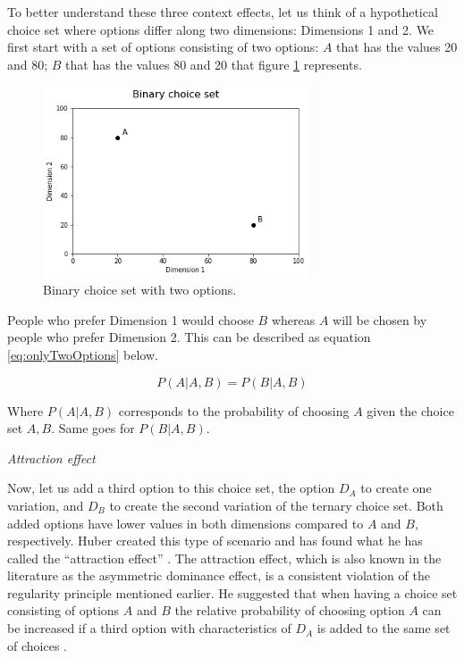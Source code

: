 \documentclass[a4paper,12pt]{article}
\newcommand{\citeyearonly}[1]{\citeyearpar{#1}}
\begin{document}
To better understand these three context effects, let us think of a hypothetical choice set where options differ along two dimensions: Dimensions 1 and 2. We first start with a set of options consisting of two options: $A$ that has the values 20 and 80; $B$ that has the values 80 and 20 that figure \ref{fig:binaryChoiseSet} represents. 

\begin{figure}[h]
    \centering
    \includegraphics[width=0.7\textwidth]{staticFiles/noEffect.png}
    \caption{Binary choice set with two options.} %
    \label{fig:binaryChoiseSet} %

\end{figure}

People who prefer Dimension 1 would choose $B$ whereas $A$ will be chosen by people who prefer Dimension 2. This can be described as equation \ref{eq:onlyTwoOptions} below.

\begin{equation}\label{eq:onlyTwoOptions}
    P(A|A,B) = P(B|A,B)
\end{equation}

Where $P(A|A,B)$ corresponds to the probability of choosing $A$ given the choice set $A,B$. Same goes for $P(B|A,B)$.

\textit{Attraction effect}

Now, let us add a third option to this choice set, the option $D_A$ to create one variation, and $D_B$ to create the second variation of the ternary choice set. Both added options have lower values in both dimensions compared to $A$ and $B$, respectively. Huber created this type of scenario and has found what he has called the ``attraction effect'' \citeyearonly{huberEtAl82}. The attraction effect, which is also known in the literature as the asymmetric dominance effect, is a consistent violation of the regularity principle mentioned earlier. He suggested that when having a choice set consisting of options $A$ and $B$ the relative probability of choosing option $A$ can be increased if a third option with characteristics of $D_A$ is added to the same set of choices \citeyearonly{huberEtAl82}.  
\end{document}

